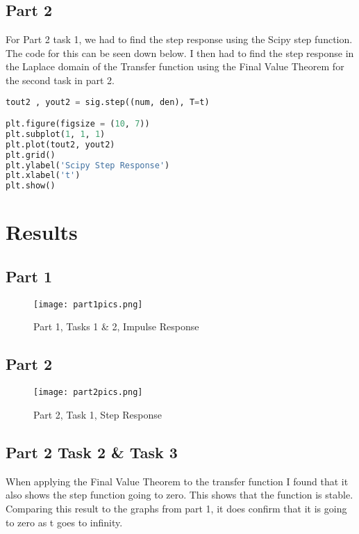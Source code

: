 \documentclass[12pt]{report}
\begin{document}
\subsection{Part 2}
For Part 2 task 1, we had to find the step response using the Scipy
step function. The code for this can be seen down below. I then had
to find the step response in the Laplace domain of the Transfer function 
using the Final Value Theorem for the second task in part 2. 
\begin{lstlisting}[language=Python]
tout2 , yout2 = sig.step((num, den), T=t)

plt.figure(figsize = (10, 7))
plt.subplot(1, 1, 1)
plt.plot(tout2, yout2)
plt.grid()
plt.ylabel('Scipy Step Response') 
plt.xlabel('t')
plt.show()
\end{lstlisting}

\section{Results}

\subsection{Part 1}
\begin{figure}[H]
\begin{center}
\caption{Part 1, Tasks 1 \& 2, Impulse Response}
\texttt{[image: part1pics.png]}
\end{center}
\end{figure}

\subsection{Part 2}
\begin{figure}[H]
\begin{center}
\caption{Part 2, Task 1, Step Response}
\texttt{[image: part2pics.png]}
\end{center}
\end{figure}

\subsection{Part 2 Task 2 \& Task 3}
When applying the Final Value Theorem to the transfer function I found
that it also shows the step function going to zero. This shows that the function is
stable. Comparing this result to the graphs from part 1, it does confirm
that it is going to zero as t goes to infinity.
\end{document}
